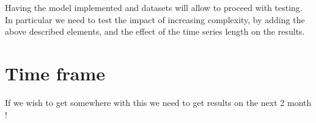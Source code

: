 \documentclass[10pt,a4paper]{article}
\begin{document}
Having the model implemented and datasets will allow to proceed with testing. In particular we need to test the impact of increasing complexity, by adding the above described elements, and the effect of the time series length on the results.

\section{Time frame}
If we wish to get somewhere with this we need to get results on the next 2 month !
\end{document}
